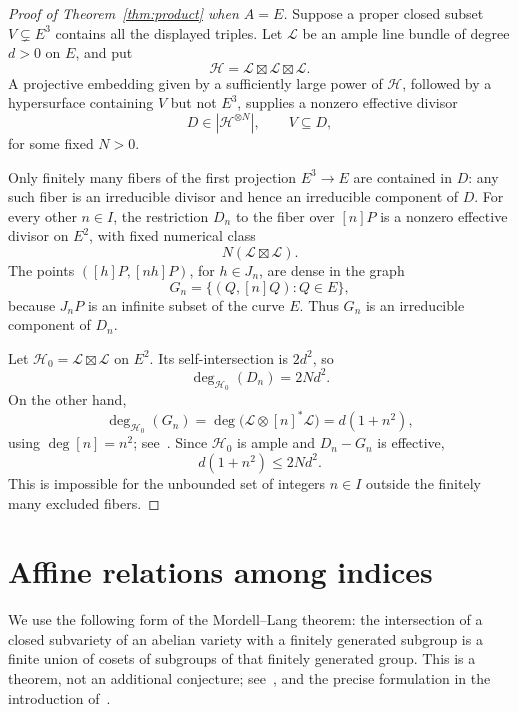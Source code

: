 \documentclass[11pt,a4paper]{article}
\theoremstyle{remark}\newtheorem{remark}[theorem]{Remark}
\begin{document}
\begin{proof}[Proof of Theorem~\ref{thm:product} when \(A=E\)]
Suppose a proper closed subset \(V\subsetneq E^3\) contains all
the displayed triples. Let \(\mathcal L\) be an ample line bundle
of degree \(d>0\) on \(E\), and put
\[
 \mathcal H=\mathcal L\boxtimes\mathcal L\boxtimes\mathcal L.
\]
A projective embedding given by a sufficiently large power of
\(\mathcal H\), followed by a hypersurface containing \(V\)
but not \(E^3\), supplies a nonzero effective divisor
\[
                      D\in|\mathcal H^{\otimes N}|,
                      \qquad V\subseteq D,
\]
for some fixed \(N>0\).

Only finitely many fibers of the first projection
\(E^3\to E\) are contained in \(D\): any such fiber is an
irreducible divisor and hence an irreducible component of \(D\).
For every other \(n\in I\), the restriction \(D_n\) to the
fiber over \([n]P\) is a nonzero effective divisor on \(E^2\),
with fixed numerical class
\[
                   N(\mathcal L\boxtimes\mathcal L).
\]
The points
\(( [h]P,[nh]P )\), for \(h\in J_n\), are dense in the graph
\[
              G_n=\{(Q,[n]Q):Q\in E\},
\]
because \(J_nP\) is an infinite subset of the curve \(E\).
Thus \(G_n\) is an irreducible component of \(D_n\).

Let \(\mathcal H_0=\mathcal L\boxtimes\mathcal L\) on \(E^2\).
Its self-intersection is \(2d^2\), so
\[
                       \deg_{\mathcal H_0}(D_n)=2Nd^2.
\]
On the other hand,
\[
 \deg_{\mathcal H_0}(G_n)
 =\deg\bigl(\mathcal L\otimes[n]^*\mathcal L\bigr)
 =d(1+n^2),
\]
using \(\deg[n]=n^2\); see~\cite[Chapter~I, Theorem~7.2]{Milne}.
Since \(\mathcal H_0\) is ample and \(D_n-G_n\) is effective,
\[
                         d(1+n^2)\le2Nd^2.
\]
This is impossible for the unbounded set of integers \(n\in I\)
outside the finitely many excluded fibers.
\end{proof}

\section{Affine relations among indices}

We use the following form of the Mordell--Lang theorem:
the intersection of a closed subvariety of an abelian variety
with a finitely generated subgroup is a finite union of cosets
of subgroups of that finitely generated group. This is a theorem,
not an additional conjecture; see~\cite{Faltings}, and the precise
formulation in the introduction of~\cite{GHSZ}.
\end{document}

